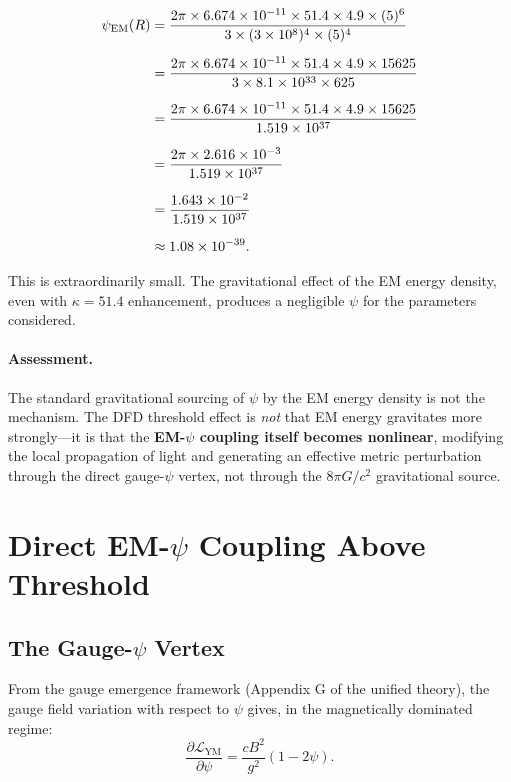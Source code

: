 \documentclass[amsmath,amssymb,aps,prd,superscriptaddress,nofootinbib]{revtex4-2}
\begin{document}
\begin{align}
\psi_\text{EM}(R) &= \frac{2\pi \times 6.674 \times 10^{-11} \times 51.4 \times 4.9 \times (5)^6}{3 \times (3 \times 10^8)^4 \times (5)^4} \notag \\[6pt]
&= \frac{2\pi \times 6.674 \times 10^{-11} \times 51.4 \times 4.9 \times 15625}{3 \times 8.1 \times 10^{33} \times 625} \notag \\[6pt]
&= \frac{2\pi \times 6.674 \times 10^{-11} \times 51.4 \times 4.9 \times 15625}{1.519 \times 10^{37}} \notag \\[6pt]
&= \frac{2\pi \times 2.616 \times 10^{-3}}{1.519 \times 10^{37}} \notag \\[6pt]
&= \frac{1.643 \times 10^{-2}}{1.519 \times 10^{37}} \notag \\[6pt]
&\approx 1.08 \times 10^{-39}.
\end{align}

This is extraordinarily small. The gravitational effect of the EM energy
density, even with $\kappa = 51.4$ enhancement, produces a negligible
$\psi$ for the parameters considered.

\paragraph{Assessment.} The standard gravitational sourcing of $\psi$ by
the EM energy density is not the mechanism. The DFD threshold effect is
\emph{not} that EM energy gravitates more strongly---it is that the
\textbf{EM-$\psi$ coupling itself becomes nonlinear}, modifying the
local propagation of light and generating an effective metric perturbation
through the direct gauge-$\psi$ vertex, not through the $8\pi G/c^2$
gravitational source.

\section{Direct EM-$\psi$ Coupling Above Threshold}\label{sec:direct}

\subsection{The Gauge-$\psi$ Vertex}

From the gauge emergence framework (Appendix G of the unified theory),
the gauge field variation with respect to $\psi$ gives, in the magnetically
dominated regime:
\begin{equation}\label{eq:gauge-backreaction}
\frac{\partial \mathcal{L}_\text{YM}}{\partial \psi} = \frac{c B^2}{g^2}(1 - 2\psi).
\end{equation}
\end{document}
